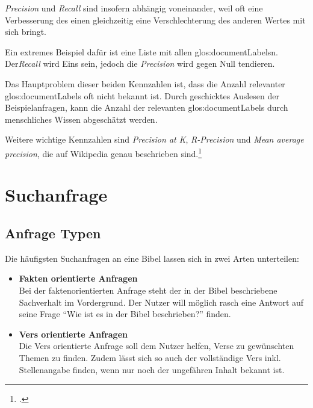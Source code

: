 \textit{Precision} und \textit{Recall} sind insofern abhängig voneinander, weil oft eine Verbesserung des einen gleichzeitig eine Verschlechterung des anderen Wertes mit sich bringt.

Ein extremes Beispiel dafür ist eine Liste mit allen \glspl{glos:documentLabel}n. Der\textit{Recall} wird Eins sein, jedoch die \textit{Precision} wird gegen Null tendieren.

Das Hauptproblem dieser beiden Kennzahlen ist, dass die Anzahl relevanter \glspl{glos:documentLabel} oft nicht bekannt ist. 
Durch geschicktes Auslesen der Beispielanfragen, kann die Anzahl der relevanten \glspl{glos:documentLabel} durch menschliches Wissen abgeschätzt werden.

Weitere wichtige Kennzahlen sind \textit{Precision at K}, \textit{R-Precision} und \textit{Mean average precision}, die auf Wikipedia genau beschrieben sind.\footcite{Information_retrieval_Wikipedia_the_free_encyclopedia_2016-05-11}


\section{Suchanfrage}

\subsection{Anfrage Typen}
Die häufigsten Suchanfragen an eine Bibel lassen sich in zwei Arten unterteilen:
\begin{itemize}
	\item \textbf{Fakten orientierte Anfragen}\\
		Bei der faktenorientierten Anfrage steht der in der Bibel beschriebene Sachverhalt im Vordergrund. Der Nutzer will möglich rasch eine Antwort auf seine Frage "`Wie ist es in der Bibel beschrieben?"' finden.
		
	\item \textbf{Vers orientierte Anfragen}\\
		Die Vers orientierte Anfrage soll dem Nutzer helfen, Verse zu gewünschten Themen zu finden.
		Zudem lässt sich so auch der vollständige Vers inkl. Stellenangabe finden, wenn nur noch der ungefähren Inhalt bekannt ist.
		
\end{itemize}



